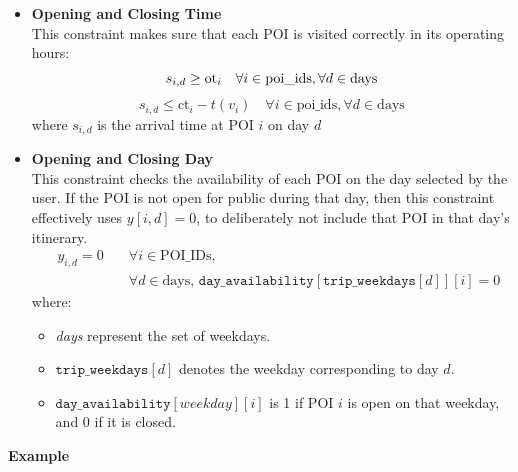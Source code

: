 {\begin{itemize}
\begin{align}
\label{mul_day_25}
\sum_{d \in \text{days}} \sum_{(i,j) \in I} \left(c^{w}_{i,j} \cdot w_{i,j} + c^{t}_{i,j} \cdot x_{i,j} \right) + \sum_{d \in \text{days}} \sum_{i \in I} c(v_i) \leq B 
\end{align}
where B is the cost budget for whole trip.
\\[1ex]
\item \textbf{Opening and Closing Time}\\
    This constraint makes sure that each POI is visited correctly in its operating hours:
    \begin{equation}
    \label{mul_day_29}
    s_{i,d} \geq \text{ot}_i \quad \forall i \in \text{{poi\_ids}}, \forall d \in \text{days} \\
    \end{equation}
    \begin{equation}
    \label{mul_day_30}
        s_{i,d} \leq \text{ct}_i - t(v_i) \quad \forall i \in \text{{poi\_ids}}, \forall d \in \text{days}
    \end{equation}
    \noindent
    where \( s_{i,d} \) is the arrival time at POI \( i \) on day \( d \)
\\[1ex]
\item \textbf{Opening and Closing Day}\\
    This constraint checks the availability of each POI on the day selected by the user. If the POI is not open for public during that day, then this constraint effectively uses $y[i, d] = 0$, to deliberately not include that POI in that day's itinerary.
    \begin{align}
    \label{mul_day_31}
 \quad y_{i,d} = 0 \quad  &\forall i \in \text{POI\_IDs}, \nonumber \\
        &\forall d \in \text{days, } \texttt{day\_availability}[\texttt{trip\_weekdays}[d]][i] = 0 \nonumber
\end{align}
    \noindent
    where:
    \begin{itemize}
        \item \textit{days} represent the set of weekdays.
        \item \( \texttt{trip\_weekdays}[d] \) denotes the weekday corresponding to day \( d \).
        \item \( \texttt{day\_availability}[weekday][i] \) is 1 if POI \( i \) is open on that weekday, and 0 if it is closed.
    \end{itemize}
\end{itemize}

\textbf{Example}

}

